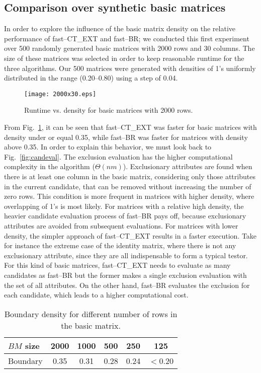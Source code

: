 \documentclass[citeauthoryear]{llncs}
\begin{document}
%
\subsection{Comparison over synthetic basic matrices}
%
In order to explore the influence of the basic matrix density on the relative performance of fast--CT\_EXT and fast--BR; we conducted this first experiment over 500 randomly generated basic matrices with 2000 rows and 30 columns. The size of these matrices was selected in order to keep reasonable runtime for the three algorithms. Our 500 matrices were generated with densities of 1's uniformly distributed in the range (0.20--0.80) using a step of 0.04. 

	\begin{figure}[htb]
	    \centering
	        \centering
	        \texttt{[image: 2000x30.eps]}	        
	        \caption{Runtime vs. density for basic matrices with 2000 rows.}
	        \label{fig:density}
	\end{figure}

From Fig.~\ref{fig:density}, it can be seen that fast--CT\_EXT was faster for basic matrices with density under or equal 0.35, while fast--BR was faster for matrices with density above 0.35. In order to explain this behavior, we must look back to Fig.~\ref{fig:candeval}. The exclusion evaluation has the higher computational complexity in the algorithm ($\Theta (nm)$). Exclusionary attributes are found when there is at least one column in the basic matrix, considering only those attributes in the current candidate, that can be removed without increasing the number of zero rows. This condition is more frequent in matrices with higher density, where overlapping of 1's is most likely. For matrices with a relative high density, the heavier candidate evaluation process of fast--BR pays off, because exclusionary attributes are avoided from subsequent evaluations. For matrices with lower density, the simpler approach of fast--CT\_EXT results in a faster execution. Take for instance the extreme case of the identity matrix, where there is not any exclusionary attribute, since they are all indispensable to form a typical testor. For this kind of basic matrices, fast--CT\_EXT needs to evaluate as many candidates as fast--BR but the former makes a single exclusion evaluation with the set of all attributes. On the other hand, fast--BR evaluates the exclusion for each candidate, which leads to a higher computational cost.

	\begin{table}[htb]
		\centering 
		\setlength{\tabcolsep}{12pt}
		\caption{Boundary density for different number of rows in the basic matrix.}
		\label{tab:boundary}
		\begin{tabular}{lccccc}
			\hline
			$BM$ size & 2000 & 1000 & 500 & 250 & 125 \\
			\hline
			Boundary  & 0.35 & 0.31 & 0.28 & 0.24 & $<$0.20 \\		
			\hline
		\end{tabular}
	\end{table}
	
\end{document}
